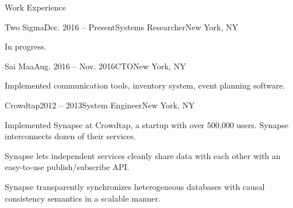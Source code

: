 \documentclass{resume} %
\begin{document}
\begin{rSection}{Work Experience}


\begin{rSubsection}{Two Sigma}{Dec. 2016 -- Present}{Systems Researcher}{New York, NY}
\item In progress.
\end{rSubsection}

\begin{rSubsection}{Sai Maa}{Aug. 2016 -- Nov. 2016}{CTO}{New York, NY}
\item Implemented communication tools, inventory system, event planning software.
\end{rSubsection}

\begin{rSubsection}{Crowdtap}{2012 -- 2013}{System Engineer}{New York, NY}
\item Implemented Synapse at Crowdtap, a startup with over 500,000 users. Synapse interconnects dozen of their services.
\item Synapse lets independent services cleanly share data with each other with 
an easy-to-use publish/subscribe API.
\item Synapse transparently synchronizes heterogeneous databases with causal consistency semantics in a scalable manner.
\end{rSubsection}




\end{rSection}
\end{document}
